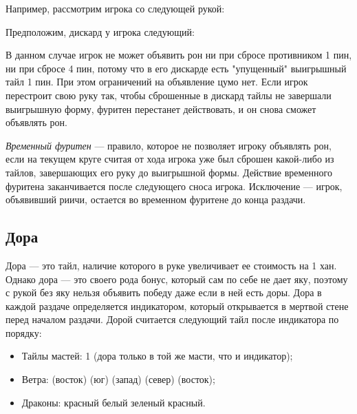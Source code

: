 \begin{example}

	Например, рассмотрим игрока со следующей рукой:
	\vspace{5mm}

	\vspace{5mm}

	Предположим, дискард у игрока следующий:
	\vspace{5mm}

	\vspace{5mm}

	В данном случае игрок не может объявить рон ни при сбросе противником 1 пин, ни при сбросе 4 пин, потому что в его дискарде есть "упущенный" выигрышный тайл 1 пин. При этом ограничений на объявление цумо нет. Если игрок перестроит свою руку так, чтобы сброшенные в дискард тайлы не завершали выигрышную форму, фуритен перестанет действовать, и он снова сможет объявлять рон.

\end{example}

\textit{Временный фуритен} --- правило, которое не позволяет игроку объявлять рон, если на текущем круге считая от хода игрока уже был сброшен какой-либо из тайлов, завершающих его руку до выигрышной формы. Действие временного фуритена заканчивается после следующего сноса игрока. Исключение --- игрок, объявивший риичи, остается во временном фуритене до конца раздачи.

\subsection{Дора}

Дора --- это тайл, наличие которого в руке увеличивает ее стоимость на 1 хан. Однако дора --- это своего рода бонус, который сам по себе не дает яку, поэтому с рукой без яку нельзя объявить победу даже если в ней есть доры. Дора в каждой раздаче определяется индикатором, который открывается в мертвой стене перед началом раздачи. Дорой считается следующий тайл после индикатора по порядку:

\begin{itemize}
	\item Тайлы мастей: 1 (дора только в той же масти, что и индикатор);
	\item Ветра:  (восток)\rightarrow
	 (юг)\rightarrow
	 (запад)\rightarrow
	 (север)\rightarrow
	 (восток);
	\item Драконы: красный\rightarrow
	белый\rightarrow
	зеленый\rightarrow
	красный.
\end{itemize}

